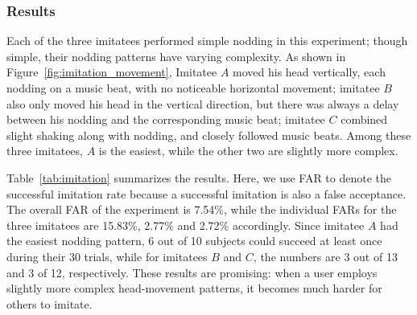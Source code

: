\subsubsection{Results}
Each of the three imitatees performed simple nodding in this experiment; though simple, their nodding patterns have varying complexity. As shown in Figure~\ref{fig:imitation_movement}, Imitatee $A$ moved his head vertically, each nodding on a music beat, with no noticeable horizontal movement; imitatee $B$ also only moved his head in the vertical direction, but there was always a delay between his nodding and the corresponding music beat; imitatee $C$ combined slight shaking along with nodding, and closely followed music beats. Among these three imitatees, $A$ is the easiest, while the other two are slightly more complex.

Table~\ref{tab:imitation} summarizes the results. Here, we use FAR to denote the successful imitation rate because a successful imitation is also a false acceptance. The overall FAR of the experiment is 7.54\%, while the individual FARs for the three imitatees are 15.83\%, 2.77\% and 2.72\% accordingly.  Since imitatee $A$ had the easiest nodding pattern, 6 out of 10 subjects could succeed at least once during their 30 trials, while for imitatees $B$ and $C$, the numbers are  3 out of 13 and 3 of 12, respectively. These results are promising: when a user employs slightly more complex head-movement patterns, it becomes much harder for others to imitate. 



